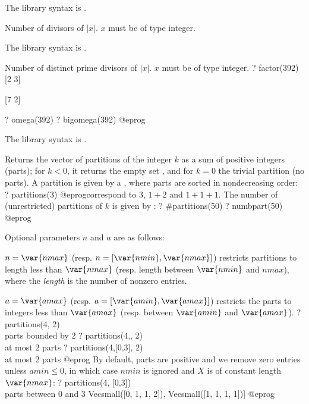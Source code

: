 The library syntax is .

\label{se:numdiv}
Number of divisors of $|x|$. $x$ must be of type integer.

The library syntax is .

\label{se:omega}
Number of distinct prime divisors of $|x|$. $x$ must be of type integer.
\bprog
? factor(392)
[2 3]

[7 2]

? omega(392)
? bigomega(392)
@eprog

The library syntax is .

\label{se:partitions}
Returns the vector of partitions of the integer $k$ as a sum of positive
integers (parts); for $k < 0$, it returns the empty set \kbd{[]}, and for $k
= 0$ the trivial partition (no parts). A partition is given by a
, where parts are sorted in nondecreasing order:
\bprog
? partitions(3)
@eprog\noindent correspond to $3$, $1+2$ and $1+1+1$. The number
of (unrestricted) partitions of $k$ is given
by :
\bprog
? #partitions(50)
? numbpart(50)
@eprog

\noindent Optional parameters $n$ and $a$ are as follows:

\item $n=\var{nmax}$ (resp. $n=[\var{nmin},\var{nmax}]$) restricts
partitions to length less than $\var{nmax}$ (resp. length between
$\var{nmin}$ and $nmax$), where the \emph{length} is the number of nonzero
entries.

\item $a=\var{amax}$ (resp. $a=[\var{amin},\var{amax}]$) restricts the parts
to integers less than $\var{amax}$ (resp. between $\var{amin}$ and
$\var{amax}$).
\bprog
? partitions(4, 2)  \\ parts bounded by 2
? partitions(4,, 2) \\ at most 2 parts
? partitions(4,[0,3], 2) \\ at most 2 parts
@eprog\noindent
By default, parts are positive and we remove zero entries unless
$amin\leq0$, in which case $nmin$ is ignored and $X$ is of constant length
$\var{nmax}$:
\bprog
? partitions(4, [0,3])  \\ parts between 0 and 3
      Vecsmall([0, 1, 1, 2]), Vecsmall([1, 1, 1, 1])]
@eprog

